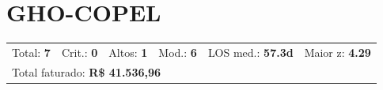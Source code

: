 \documentclass[a4paper,10pt]{article}
\begin{document}
\newpage

\clearpage
\section{GHO-COPEL}
\begin{tcolorbox}[colback=lightblue,colframe=jcubeblue,title={\textbf{Resumo --- GHO-COPEL}}]
\begin{tabular}{ll@{\quad}ll@{\quad}ll}
Total: \textbf{7} &
Crit.: \textcolor{anomred}{\textbf{0}} &
Altos: \textcolor{anomorange}{\textbf{1}} &
Mod.: \textcolor{anomyellow}{\textbf{6}} &
LOS med.: \textbf{57.3d} &
Maior z: \textbf{4.29} \\

\multicolumn{6}{l}{Total faturado: \textbf{R\$ 41.536,96}} \\

\end{tabular}
\end{tcolorbox}
\end{document}
